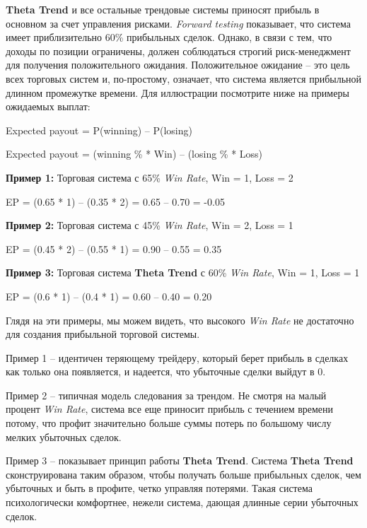 \documentclass[12pt,DIV=18]{scrartcl}
\begin{document}
\bigskip
 
\textbf{Theta Trend} и все остальные трендовые системы приносят прибыль в основном за счет управления рисками. \textit{Forward  testing} показывает, что система имеет приблизительно 60\% прибыльных сделок. Однако, в связи с тем, что доходы по позиции ограничены, должен соблюдаться строгий риск-менеджмент для получения положительного ожидания. Положительное ожидание -- это цель всех торговых систем и, по-простому, означает, что система является прибыльной длинном промежутке времени. Для иллюстрации посмотрите ниже на примеры ожидаемых выплат:
 
\bigskip
 
\setlength{\parindent}{0.5cm}
Expected payout = P(winning) -- P(losing)\par
Expected payout = (winning \% * Win) -- (losing \% * Loss)\par
\bigskip
\textbf{Пример 1:} Торговая система с 65\% \textit{Win Rate}, Win = 1, Loss = 2\par
\bigskip
EP = (0.65 * 1) -- (0.35 * 2) = 0.65 -- 0.70 = -0.05\par
\bigskip
\textbf{Пример 2:} Торговая система с 45\% \textit{Win Rate}, Win = 2, Loss = 1\par
\bigskip
EP = (0.45 * 2) -- (0.55 * 1) = 0.90 -- 0.55 = 0.35\par
\bigskip
\textbf{Пример 3:} Торговая система \textbf{Theta Trend} с 60\% \textit{Win Rate}, Win = 1, Loss = 1\par
\bigskip
EP = (0.6 * 1) -- (0.4 * 1) = 0.60 -- 0.40 = 0.20\par

\bigskip
 
Глядя на эти примеры, мы можем видеть, что высокого \textit{Win Rate} не достаточно для создания прибыльной торговой системы.
 
\bigskip
 
Пример 1 -- идентичен теряющему трейдеру, который берет прибыль в сделках как только она появляется, и надеется, что убыточные сделки выйдут в 0.

\bigskip
 
Пример 2 -- типичная модель следования за трендом. Не смотря на малый процент \textit{Win Rate}, система все еще приносит прибыль с течением времени потому, что профит значительно больше суммы потерь по большому числу мелких убыточных сделок.

\bigskip
 
Пример 3 -- показывает принцип работы \textbf{Theta Trend}. Система \textbf{Theta Trend} сконструирована таким образом, чтобы получать больше прибыльных сделок, чем убыточных и быть в профите, четко управляя потерями. Такая система психологически комфортнее, нежели система, дающая длинные серии убыточных сделок.
\end{document}
